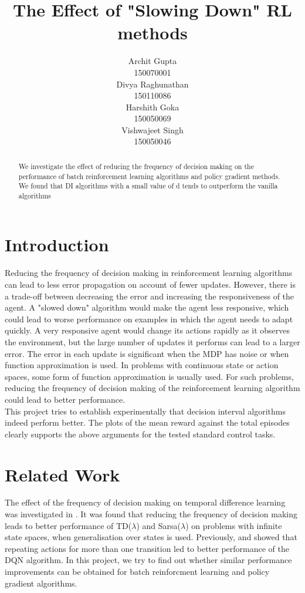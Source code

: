 \documentclass{article}
\title{The Effect of "Slowing Down" RL methods}
\author{
  Archit Gupta \\
  150070001\\
  \And
  Divya Raghunathan\\
  150110086\\
  \And
  Harshith Goka\\
  150050069\\
  \And
  Vishwajeet Singh\\
  150050046\\
}
\begin{document}

\maketitle

\begin{abstract}
  We investigate the effect of reducing the frequency of decision making on the performance of batch reinforcement learning algorithms and policy gradient methods. We found that DI algorithms with a small value of d tends to outperform the vanilla algorithms
\end{abstract}

\section{Introduction}
Reducing the frequency of decision making in reinforcement learning algorithms can lead to less error propagation on account of fewer updates. However, there is a trade-off between decreasing the error and increasing the responsiveness of the agent. A "slowed down" algorithm would make the agent less responsive, which could lead to worse performance on examples in which the agent needs to adapt quickly. A very responsive agent would change its actions rapidly as it observes the environment, but the large number of updates it performs can lead to a larger error. The error in each update is significant when the MDP has noise or when function approximation is used. In problems with continuous state or action spaces, some form of function approximation is usually used. For such problems, reducing the frequency of decision making of the reinforcement learning algorithm could lead to better performance.\\
This project tries to establish experimentally that decision interval algorithms indeed perform better. The plots of the mean reward against the total episodes clearly supports the above arguments for the tested standard control tasks. 

\section{Related Work}
The effect of the frequency of decision making on temporal difference learning was investigated in \citet{mtp}. It was found that reducing the frequency of decision making leads to better performance of TD($\lambda$) and Sarsa($\lambda$) on problems with infinite state spaces, when generalisation over states is used. Previously, \citet{durugkar2016deep}and \citet{sharma2017learning} showed that repeating actions for more than one transition led to better performance of the DQN algorithm. In this project, we try to find out whether similar performance improvements can be obtained for batch reinforcment learning and policy gradient algorithms.
\end{document}
